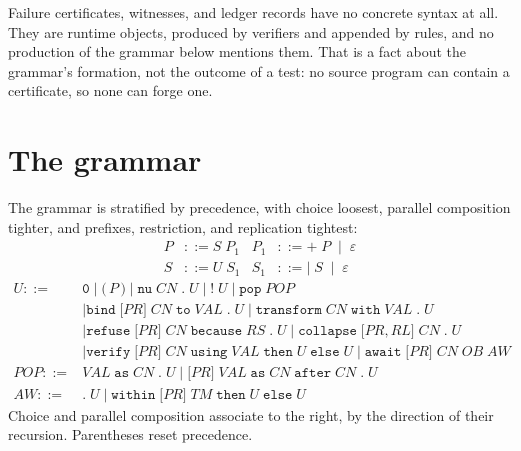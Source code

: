\documentclass[11pt,openany]{book}
\theoremstyle{remark}
\begin{document}
Failure certificates, witnesses, and ledger records have no concrete
syntax at all. They are runtime objects, produced by verifiers and
appended by rules, and no production of the grammar below mentions them.
That is a fact about the grammar's formation, not the outcome of a test:
no source program can contain a certificate, so none can forge one.

\section{The grammar}

The grammar is stratified by precedence, with choice loosest, parallel
composition tighter, and prefixes, restriction, and replication tightest:
\[
\begin{aligned}
P &::= S\;P_1 & P_1 &::= \texttt{+}\;P\;\mid\;\varepsilon\\
S &::= U\;S_1 & S_1 &::= \texttt{|}\;S\;\mid\;\varepsilon
\end{aligned}
\]
\[
\begin{aligned}
U ::= {}& \texttt{0}\mid \texttt{(}\,P\,\texttt{)}
\mid \texttt{nu}\;\mathit{CN}\;\texttt{.}\;U \mid \texttt{!}\;U
\mid \texttt{pop}\;\mathit{POP}\\
&\mid \texttt{bind}\;\texttt{[}\mathit{PR}\texttt{]}\;\mathit{CN}\;\texttt{to}\;\mathit{VAL}\;\texttt{.}\;U
\mid \texttt{transform}\;\mathit{CN}\;\texttt{with}\;\mathit{VAL}\;\texttt{.}\;U\\
&\mid \texttt{refuse}\;\texttt{[}\mathit{PR}\texttt{]}\;\mathit{CN}\;\texttt{because}\;\mathit{RS}\;\texttt{.}\;U
\mid \texttt{collapse}\;\texttt{[}\mathit{PR}\texttt{,}\,\mathit{RL}\texttt{]}\;\mathit{CN}\;\texttt{.}\;U\\
&\mid \texttt{verify}\;\texttt{[}\mathit{PR}\texttt{]}\;\mathit{CN}\;\texttt{using}\;\mathit{VAL}\;\texttt{then}\;U\;\texttt{else}\;U
\mid \texttt{await}\;\texttt{[}\mathit{PR}\texttt{]}\;\mathit{CN}\;\mathit{OB}\;\mathit{AW}\\
\mathit{POP} ::= {}& \mathit{VAL}\;\texttt{as}\;\mathit{CN}\;\texttt{.}\;U
\mid \texttt{[}\mathit{PR}\texttt{]}\;\mathit{VAL}\;\texttt{as}\;\mathit{CN}\;\texttt{after}\;\mathit{CN}\;\texttt{.}\;U\\
\mathit{AW} ::= {}& \texttt{.}\;U
\mid \texttt{within}\;\texttt{[}\mathit{PR}\texttt{]}\;\mathit{TM}\;\texttt{then}\;U\;\texttt{else}\;U
\end{aligned}
\]
Choice and parallel composition associate to the right, by the direction
of their recursion. Parentheses reset precedence.
\end{document}
